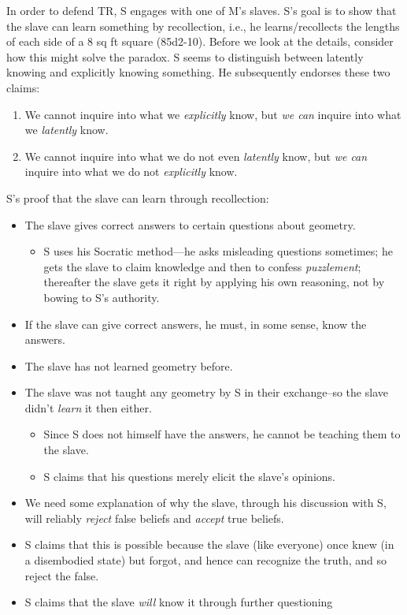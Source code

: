 \documentclass[10 pt]{article}
\begin{document}
\begin{description}
In order to defend TR, S engages with one of M's slaves. S's goal is to show that the slave can learn something by recollection, i.e., he learns/recollects the lengths of each side of a 8 sq ft square (85d2-10). Before we look at the details, consider how this might solve the paradox. S seems to distinguish between latently knowing and explicitly knowing something. He subsequently endorses these two claims:  

\begin{enumerate}
\item We cannot inquire into what we \emph{explicitly} know, but \emph{we can} inquire into what we \emph{latently} know. 
\item We cannot inquire into what we do not even \emph{latently} know, but \emph{we can} inquire into what we do not \emph{explicitly} know.
\end{enumerate}



\noindent S's proof that the slave can learn through recollection:

\begin{itemize}
\item The slave gives correct answers to certain questions about geometry.
\begin{itemize}
\item S uses his Socratic method---he asks misleading questions sometimes; he gets the slave to claim knowledge and then to confess \emph{puzzlement}; thereafter the slave gets it right by applying his own reasoning, not by bowing to S's authority.
\end{itemize}
\item If the slave can give correct answers, he must, in some sense, know the answers. 
\item The slave has not learned geometry before. 
\item The slave was not taught any geometry by S in their exchange--so the slave didn't \emph{learn} it then either.
\begin{itemize}
\item Since S does not himself have the answers, he cannot be teaching them to the slave. 
\item S claims that his questions merely elicit the slave's opinions. 
\end{itemize}
\item We need some explanation of why the slave, through his discussion with S, will reliably \emph{reject} false beliefs and \emph{accept} true beliefs. 
\item S claims that this is possible because the slave (like everyone) once knew (in a disembodied state) but forgot, and hence can recognize the truth, and so reject the false.
\item S claims that the slave \emph{will} know it through further questioning
\end{itemize}
 

\end{description}
\end{document}
